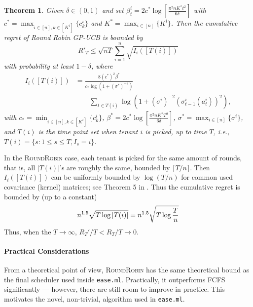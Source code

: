 \documentclass[letterpaper]{vldb}
\newcommand{\eml}{\texttt{ease.ml}\xspace}
\newcommand{\rr}{\textsc{RoundRobin}\xspace}
\newtheorem{theorem}{Theorem}
\begin{document}
\vspace{-0.5em}
\begin{theorem}
  \label{thm:rr}
  Given $\delta\in (0,1)$ and set $\beta_t^i = 2c^\ast \log\left[\frac{\pi^2 n K^\ast t^2}{6\delta}\right]$ with $c^\ast = \max_{i\in [n], k\in [K^i]}\{c^i_k\}$ and $K^\ast = \max_{i\in [n]}\{K^i\}$. Then the
  cumulative regret of Round Robin GP-UCB is bounded by
  \[
     R'_T \leq \sqrt{n T}\sum_{i=1}^n \sqrt{I_i([T(i)])}
  \]
  with probability at least $1-\delta$,
  where
  \begin{align*}
    I_i([T(i)]) & = \frac{8 (c^\ast)^2 \beta^\ast}{c_\ast \log(1 + (\sigma^\ast)^{-2})}\\
    &\qquad \sum_{t\in T(i)} \log\left(1 + (\sigma^i)^{-2}(\sigma^i_{t-1}(a^i_{t}))^2\right),
  \end{align*}
  with $c_\ast = \min_{i\in [n], k\in [K^i]}\{c^i_k\}$,  $\beta^\ast = 2c^\ast \log\left[\frac{\pi^2 n K^\ast T^2}{6\delta}\right]$, $\sigma^\ast= \max_{i\in [n]}\{\sigma^i\}$, and $T(i)$ is the time point set when tenant $i$ is picked, up to time $T$, i.e.,
  $T(i) = \{s: 1\le s\le T, I_s = i\}$.
\end{theorem}

In the \rr case, each tenant is picked for the same amount of rounds, that is, all $|T(i)|$'s are roughly the same, bounded by $\lceil T/n\rceil$. Then $I_i([T(i)])$ can be uniformly bounded by $\log (T/n)$ for common used covariance (kernel) matrices; see Theorem 5 in \cite{SrinivasKKS10}. Thus the cumulative regret is bounded by (up to a constant) 
\begin{equation}
n^{1.5}\sqrt{T \log |T(i)|} = n^{1.5}\sqrt{T \log {T\over n}}
\label{eq:RR_simple_bound}
\end{equation}
Thus, when the $T \rightarrow \infty$,
$R_T'/T < R_T/T \rightarrow 0$.

\vspace{-0.5em}
\paragraph*{Practical Considerations}
From a theoretical point of view,
\rr has the same theoretical bound
as the final scheduler used inside \eml.
Practically, it outperforms FCFS 
significantly --- however, there are
still room to improve in practice. This
motivates the novel, non-trivial, algorithm
used in \eml.
\end{document}
